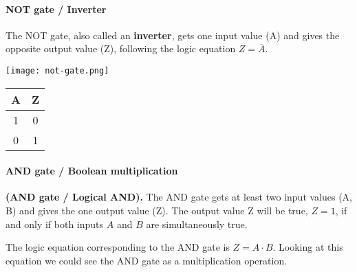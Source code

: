 \newpage
\paragraph{NOT gate / Inverter}
\begin{definition} The NOT gate, also called an \textbf{inverter}, gets one input value (A) and gives the opposite output value (Z), following the logic equation $Z = \overline{A}$.
\end{definition}

\begin{minipage}{\textwidth}
\vspace{1cm}
\begin{minipage}[c]{0.49\textwidth}
    \centering
    \texttt{[image: not-gate.png]}
\end{minipage}
\hfill
\begin{minipage}[c]{.49\textwidth}
    \centering
    \begin{tabular}{ |c|c| } \hline 
        \textbf{A} & \textbf{Z} \\ \hline
        1 & 0 \\
        0 & 1 \\
        \hline
    \end{tabular}
\end{minipage}
\end{minipage}


\paragraph{AND gate / Boolean multiplication}
\begin{definition} 
    \textbf{(AND gate / Logical AND).} The AND gate gets at least two input values (A, B) and gives the one output value (Z). The output value Z will be true, $Z = 1$, if and only if both inputs $A$ and $B$ are simultaneously true. 
\end{definition}
The logic equation corresponding to the AND gate is $Z = A\cdot B$. Looking at this equation we could see the AND gate as a multiplication operation.

